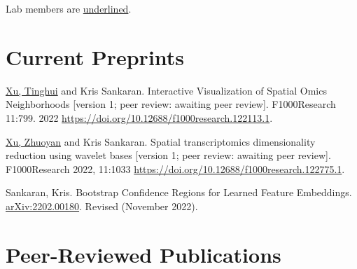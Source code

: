 \documentclass[letterpaper]{article}
\renewenvironment{itemize}{
  \begin{list}{}{
    \setlength{\leftmargin}{1.5em}
  }
}{
  \end{list}
}
\begin{document}
\pagebreak
Lab members are \underline{underlined}.
\section*{Current Preprints}

\begin{itemize}
\item \underline{Xu, Tinghui} and Kris Sankaran. Interactive Visualization of
Spatial Omics Neighborhoods [version 1; peer review: awaiting peer review]. F1000Research 11:799. 2022
\href{https://doi.org/10.12688/f1000research.122113.1}{https://doi.org/10.12688/f1000research.122113.1}.
\item \underline{Xu, Zhuoyan} and Kris Sankaran. Spatial transcriptomics dimensionality reduction
using wavelet bases [version 1; peer review: awaiting peer review].
F1000Research 2022, 11:1033 \href{https://doi.org/10.12688/f1000research.122775.1}{https://doi.org/10.12688/f1000research.122775.1}.
\item Sankaran, Kris. Bootstrap Confidence Regions for Learned Feature
Embeddings. \href{https://arxiv.org/abs/2202.00180}{arXiv:2202.00180}. Revised
(November 2022).
\end{itemize}
\section*{Peer-Reviewed Publications}
\end{document}
